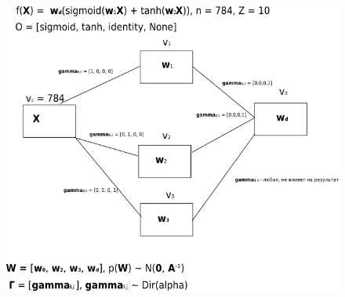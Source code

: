 \documentclass[12pt]{article}
\begin{document}
\clearpage
\begin{figure}[TBPH!]
\includegraphics[width=\textwidth]{model_search.png}
\end{figure}
 
\end{document}
